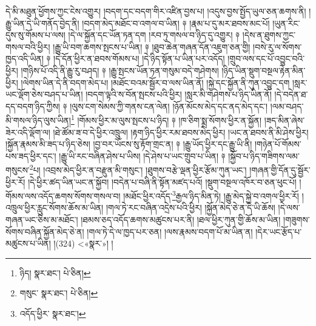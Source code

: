དེ་མི་མཐུན་ཕྱོགས་ཀྱང་ངེས་འགྱུར། །བདག་དང་བདག་གིར་འཛིན་བྱས་པ། །འདུས་བྱས་སྤྱོད་ཡུལ་ཅན་ཆགས་ནི། །རྒྱུ་ཡིན་དེ་ཡི་གནོད་བྱེད་ནི། །བདག་མེད་མཐོང་བ་འགལ་བ་ཡིན། ༈ །རྣམ་པ་དུ་མར་ཐབས་མང་པོ། །ཡུན་རིང་དུས་སུ་གོམས་པ་ལས། །དེ་ལ་སྐྱོན་དང་ཡོན་ཏན་དག །རབ་ཏུ་གསལ་བ་ཉིད་དུ་འགྱུར། ༈ །དེས་ན་ཐུགས་ཀྱང་གསལ་བའི་ཕྱིར། །རྒྱུ་ཡི་བག་ཆགས་སྤངས་པ་ཡིན། ༈ །ཐུབ་ཆེན་གཞན་དོན་འཇུག་ཅན་གྱི། །བསེ་རུ་ལ་སོགས་ཁྱད་འདི་ཡིན། ༈ །དེ་དོན་ཕྱིར་ན་ཐབས་གོམས་པ། །དེ་ཉིད་སྟོན་པ་ཡིན་པར་འདོད། །གྲུབ་ལས་དང་པོ་འབྱུང་བའི་ཕྱིར། །གཉིས་པོ་འདི་ནི་རྒྱུ་རུ་བཤད། ༈ །རྒྱུ་སྤངས་ཡོན་ཏན་གསུམ་བདེ་གཤེགས། །ཉིད་ཡིན་སྡུག་བསྔལ་རྟེན་མིན་ཕྱིར། །ལེགས་ཡིན་དེ་ནི་བདག་མེད་པ། །མཐོང་བའམ་སྦྱོར་བ་ལས་ཡིན་ནོ། །སྐྱེ་དང་སྐྱོན་ནི་ཀུན་འབྱུང་དག །སླར་ཡང་ལྡོག་ཅེས་བཤད་པ་ཡིན། །བདག་ལྟའི་ས་བོན་སྤངས་པའི་ཕྱིར། །སླར་མི་གཤེགས་པ་ཉིད་ཡིན་ནོ། །དེ་བདེན་ཐ་དད་བདག་ཉིད་ཀྱིས། ༈ །ལུས་ངག་སེམས་ཀྱི་གནས་ངན་ལེན། །ཉོན་མོངས་མེད་དང་ནད་མེད་དང་། །ལམ་བཤད་མི་གསལ་ཉིད་ལུས་ཡིན།\footnote{ཉིད།  སྣར་ཐང་།  པེ་ཅིན། } །གོམས་ཕྱིར་མ་ལུས་སྤངས་པ་ཉིད། ༈ །ཁ་ཅིག་སྨྲ་སོགས་ཕྱིར་ན་སྐྱོན། །ཟད་མིན་ཞེས་ཟེར་འདི་ལྡོག་ལ། །ཐེ་ཚོམ་ཟ་བ་དེ་ཕྱིར་འཁྲུལ། །རྟག་ཉིད་ཕྱིར་རམ་ཐབས་མེད་ཕྱིར། །ཡང་ན་ཐབས་ནི་མི་ཤེས་ཕྱིར། །སྐྱོན་རྣམས་མི་ཟད་པ་ཉིད་ཅེས། །བྱ་བར་ཡོངས་སུ་རྟོག་གྲང་ན། ༈ །རྒྱུ་ཡོད་ཕྱིར་དང་རྒྱུ་ཡི་ནི། །གཉེན་པོ་གོམས་པས་ཟད་ཕྱིར་དང་། །རྒྱུ་ཡི་རང་བཞིན་ཤེས་པ་ཡིས། །དེ་ཤེས་པ་ཡང་གྲུབ་པ་ཡིན། ༈ །སྐྱོབ་པ་ཉིད་གཟིགས་ལམ་གསུངས་\footnote{གསུང་  སྣར་ཐང་།  པེ་ཅིན། }པ། །འབྲས་མེད་ཕྱིར་ན་བརྫུན་མི་གསུང་། །ཐུགས་བརྩེ་ལྡན་ཕྱིར་རྩོམ་ཀུན་ཡང་། །གཞན་གྱི་དོན་དུ་སྦྱོར་ཕྱིར་རོ། །དེ་ཕྱིར་ཚད་ཡིན་ཡང་ན་སྐྱོབ། །བདེན་པ་བཞི་ནི་སྟོན་མཛད་པའོ། །སྡུག་བསྔལ་འཁོར་བ་ཅན་ཕུང་པོ། །གོམས་ལས་འདོད་ཆགས་སོགས་གསལ་བ། །མཐོང་ཕྱིར་འདོད་\footnote{འདོད་ཕྱིར་  སྣར་ཐང་། }རྒྱལ་ཉིད་མིན་ཏེ། །རྒྱུ་མེད་སྐྱེ་བ་འགལ་ཕྱིར་རོ། །འཁྲུལ་ཕྱིར་རླུང་སོགས་ཆོས་མ་ཡིན། །གལ་ཏེ་རང་བཞིན་འདྲེས་པའི་ཕྱིར། །སྐྱོན་མེད་ཅེ་ན་དེ་ཡི་ཆོས། །དེ་ལས་གཞན་ཡང་ཅིས་མ་མཐོང་། །ཐམས་ཅད་འདོད་ཆགས་མཚུངས་པར་ནི། །ཐལ་ཕྱིར་ཀུན་གྱི་ཆོས་མ་ཡིན། །གཟུགས་སོགས་བཞིན་སྐྱོན་མེད་ཅེ་ན། །གལ་ཏེ་དེ་ལ་ཁྱད་པར་ཅན། །ལས་རྣམས་བདག་པོ་མ་ཡིན་ན། །དེར་ཡང་རྩོད་པ་མཚུངས་པ་ཡིན། །(324) <«སྣར་»། །
